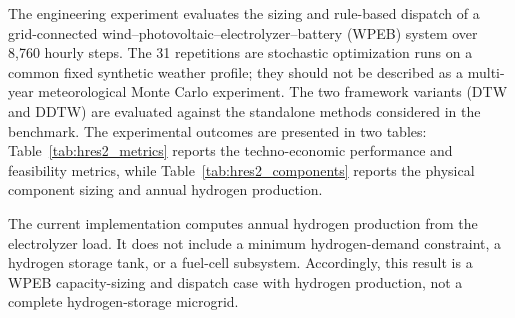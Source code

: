 The engineering experiment evaluates the sizing and rule-based dispatch of a
grid-connected wind--photovoltaic--electrolyzer--battery (WPEB) system over
8,760 hourly steps. The 31 repetitions are stochastic optimization runs on a
common fixed synthetic weather profile; they should not be described as a
multi-year meteorological Monte Carlo experiment. The two framework variants
(DTW and DDTW) are evaluated against the standalone methods considered in the
benchmark. The experimental outcomes are presented in two tables: Table~\ref{tab:hres2_metrics} reports the
techno-economic performance and feasibility metrics, while
Table~\ref{tab:hres2_components} reports the physical component sizing and
annual hydrogen production.

The current implementation computes annual hydrogen production from the
electrolyzer load. It does not include a minimum hydrogen-demand constraint, a
hydrogen storage tank, or a fuel-cell subsystem. Accordingly, this result is a
WPEB capacity-sizing and dispatch case with hydrogen production, not a
complete hydrogen-storage microgrid.

